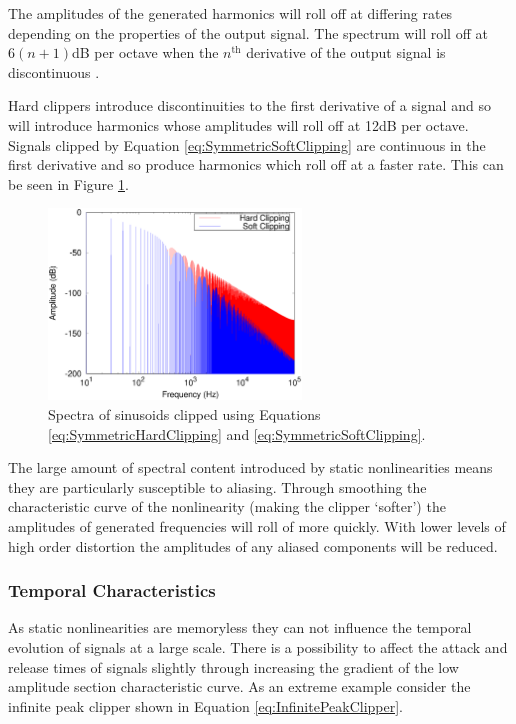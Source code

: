 			The amplitudes of the generated harmonics will roll off at differing rates depending on the
			properties of the output signal. The spectrum will roll off at $6(n+1)$dB per octave when the
			$n^{\text{th}}$ derivative of the output signal is discontinuous \citep{kraght2000aliasing}.

			Hard clippers introduce discontinuities to the first derivative of a signal and so will introduce
			harmonics whose amplitudes will roll off at 12dB per octave. Signals clipped by Equation
			\ref{eq:SymmetricSoftClipping} are continuous in the first derivative and so produce harmonics
			which roll off at a faster rate. This can be seen in Figure \ref{fig:ClippingSpectra}.

			\begin{figure}[h!]
				\centering
				\includegraphics[width=0.6\textwidth]{chapter3/Images/ClippingSpectra.eps}
				\caption{Spectra of sinusoids clipped using Equations \ref{eq:SymmetricHardClipping} and
			                 \ref{eq:SymmetricSoftClipping}.}
				\label{fig:ClippingSpectra}
			\end{figure}

			The large amount of spectral content introduced by static nonlinearities means they are
			particularly susceptible to aliasing. Through smoothing the characteristic curve of the
			nonlinearity (making the clipper `softer') the amplitudes of generated frequencies will roll of
			more quickly. With lower levels of high order distortion the amplitudes of any aliased components
			will be reduced.

		\subsubsection*{Temporal Characteristics}
			As static nonlinearities are memoryless they can not influence the temporal evolution of signals at
			a large scale. There is a possibility to affect the attack and release times of signals slightly
			through increasing the gradient of the low amplitude section characteristic curve. As an extreme
			example consider the infinite peak clipper shown in Equation \ref{eq:InfinitePeakClipper}.

